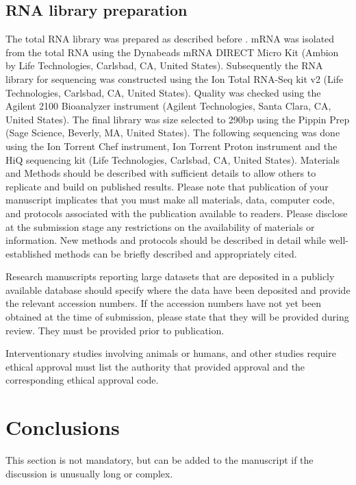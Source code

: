 \documentclass[jof,article,submit,moreauthors,pdftex,10pt,a4paper]{Definitions/mdpi}
\begin{document}
\subsection{RNA library preparation}
The total RNA library was prepared as described before \cite{Poyntner2016}. mRNA was isolated from the total RNA using the Dynabeads mRNA DIRECT Micro Kit (Ambion by Life Technologies, Carlsbad, CA, United States). Subsequently the RNA library for sequencing was constructed using the Ion Total RNA-Seq kit v2 (Life Technologies, Carlsbad, CA, United States). Quality was checked using the Agilent 2100 Bioanalyzer instrument (Agilent Technologies, Santa Clara, CA, United States). The final library was size selected to 290bp using the Pippin Prep (Sage Science, Beverly, MA, United States). The following sequencing was done using the Ion Torrent Chef instrument, Ion Torrent Proton instrument and the HiQ sequencing kit (Life Technologies, Carlsbad, CA, United States). 
Materials and Methods should be described with sufficient details to allow others to replicate and build on published results. Please note that publication of your manuscript implicates that you must make all materials, data, computer code, and protocols associated with the publication available to readers. Please disclose at the submission stage any restrictions on the availability of materials or information. New methods and protocols should be described in detail while well-established methods can be briefly described and appropriately cited.

Research manuscripts reporting large datasets that are deposited in a publicly available database should specify where the data have been deposited and provide the relevant accession numbers. If the accession numbers have not yet been obtained at the time of submission, please state that they will be provided during review. They must be provided prior to publication.

Interventionary studies involving animals or humans, and other studies require ethical approval must list the authority that provided approval and the corresponding ethical approval code. 

\section{Conclusions}

This section is not mandatory, but can be added to the manuscript if the discussion is unusually long or complex.
\end{document}
